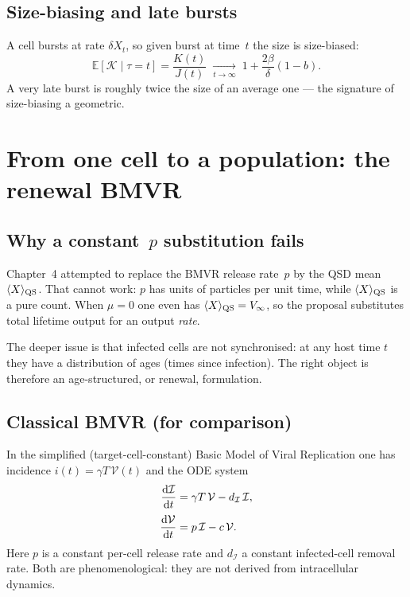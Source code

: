\documentclass[11pt,a4paper]{article}
\newcommand{\dd}{{\rm d}}
\newcommand{\E}{\mathbb{E}}
\newcommand{\xt}{X_t}
\newcommand{\Kb}{\mathcal{K}}
\newcommand{\Icell}{\mathcal{I}}
\newcommand{\Vfree}{\mathcal{V}}
\newcommand{\ddt}[1]{\frac{\dd #1}{\dd t}}
\theoremstyle{plain}
\theoremstyle{definition}
\theoremstyle{remark}
\begin{document}
\subsection{Size-biasing and late bursts}

A cell bursts at rate $\delta\xt$, so given burst at time~$t$ the size is
size-biased:
\[
\E[\Kb\mid\tau=t]=\frac{K(t)}{J(t)}
\;\xrightarrow[t\to\infty]{}\;
1+\frac{2\beta}{\delta}(1-b).
\]
A very late burst is roughly twice the size of an average one --- the signature
of size-biasing a geometric.

\section{From one cell to a population: the renewal BMVR}

\subsection{Why a constant~$p$ substitution fails}

Chapter~4 attempted to replace the BMVR release rate~$p$ by the QSD mean
$\langle X\rangle_{\rm QS}$. That cannot work: $p$ has units of particles per
unit time, while $\langle X\rangle_{\rm QS}$ is a pure count. When $\mu=0$ one
even has $\langle X\rangle_{\rm QS}=V_\infty$, so the proposal substitutes total
lifetime output for an output \emph{rate}.

The deeper issue is that infected cells are not synchronised: at any host time
$t$ they have a distribution of ages (times since infection). The right object
is therefore an age-structured, or renewal, formulation.

\subsection{Classical BMVR (for comparison)}

In the simplified (target-cell-constant) Basic Model of Viral Replication one
has incidence $i(t)=\gamma T\,\Vfree(t)$ and the ODE system
\begin{equation}
\label{eq:BMVR-classical}
\begin{aligned}
\ddt{\Icell}
&= \gamma T\,\Vfree - d_{\Icell}\,\Icell,\\[0.25em]
\ddt{\Vfree}
&= p\,\Icell - c\,\Vfree.
\end{aligned}
\end{equation}
Here $p$ is a constant per-cell release rate and $d_{\Icell}$ a constant infected-cell
removal rate. Both are phenomenological: they are not derived from intracellular
dynamics.
\end{document}

